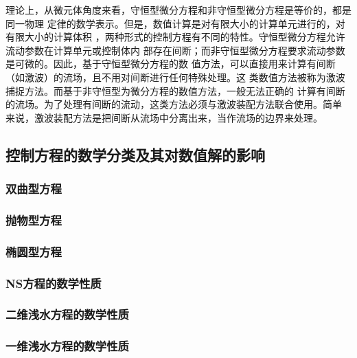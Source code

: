                                                                 理论上，从微元体角度来看，守恒型微分方程和非守恒型微分方程是等价的，都是同一物理
                                                                定律的数学表示。但是，数值计算是对有限大小的计算单元进行的，对有限大小的计算体积
                                                                ，两种形式的控制方程有不同的特性。守恒型微分方程允许流动参数在计算单元或控制体内
                                                                部存在间断；而非守恒型微分方程要求流动参数是可微的。因此，基于守恒型微分方程的数
                                                                值方法，可以直接用来计算有间断（如激波）的流场，且不用对间断进行任何特殊处理。这
                                                                类数值方法被称为激波捕捉方法。而基于非守恒型为微分方程的数值方法，一般无法正确的
                                                                计算有间断的流场。为了处理有间断的流动，这类方法必须与激波装配方法联合使用。简单
                                                                来说，激波装配方法是把间断从流场中分离出来，当作流场的边界来处理。

                                                                \subsection{控制方程的数学分类及其对数值解的影响}

                                                                \subsubsection{双曲型方程}

                                                                \subsubsection{抛物型方程}

                                                                \subsubsection{椭圆型方程}

                                                                \subsubsection{NS方程的数学性质}

                                                                \subsubsection{二维浅水方程的数学性质}

                                                                \subsubsection{一维浅水方程的数学性质}

